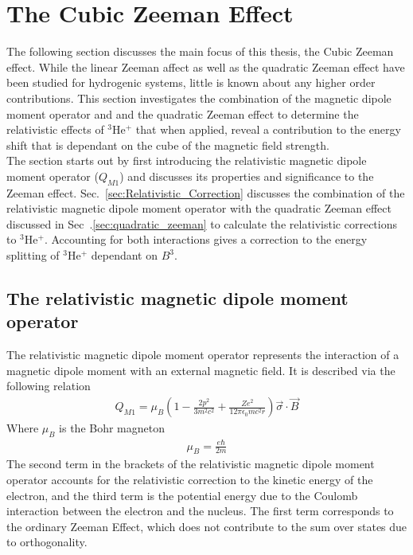     \section{The Cubic Zeeman Effect}
        The following section discusses the main focus of this thesis, the Cubic Zeeman effect. While the linear Zeeman affect as well as the quadratic Zeeman effect have been studied for hydrogenic systems, little is known about any higher order contributions. This section investigates the combination of the magnetic dipole moment operator and and the quadratic Zeeman effect to determine the relativistic effects of $^3$He$^+$ that when applied, reveal a contribution to the energy shift that is dependant on the cube of the magnetic field strength.\\

        The section starts out by first introducing the relativistic magnetic dipole moment operator ($Q_{M1}$) and discusses its properties and significance to the Zeeman effect. Sec.~\ref{sec:Relativistic_Correction} discusses the combination of the relativistic magnetic dipole moment operator with the quadratic Zeeman effect discussed in Sec~.\ref{sec:quadratic_zeeman} to calculate the relativistic corrections to $^3$He$^+$. Accounting for both interactions gives a correction to the energy splitting of $^3$He$^+$ dependant on $B^3$.

        \subsection{The relativistic magnetic dipole moment operator}\label{sec:magnetic_dipole_operator}
            The relativistic magnetic dipole moment operator represents the interaction of a magnetic dipole moment with an external magnetic field. It is described via the following relation
            \begin{align}
                Q_{M1} = \mu_B \left( 1 - \frac{2p^2}{3m^2 c^2} + \frac{Ze^2}{12\pi \epsilon_0 mc^2r} \right) \vec{\sigma} \cdot \vec{B}
            \end{align}
            \noindent Where $\mu_B$ is the Bohr magneton
            \begin{align}
                \mu_B = \frac{e \hbar}{2m}
            \end{align}
            \noindent The second term in the brackets of the relativistic magnetic dipole moment operator accounts for the relativistic correction to the kinetic energy of the electron, and the third term is the potential energy due to the Coulomb interaction between the electron and the nucleus. The first term corresponds to the ordinary Zeeman Effect, which does not contribute to the sum over states due to orthogonality.\\

